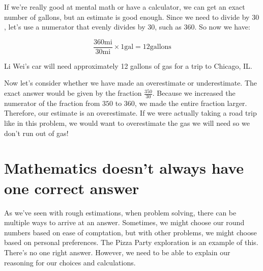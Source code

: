 \documentclass{ximera}
\begin{document}
\begin{example}
\begin{explanation}
If we're really good at mental math or have a calculator, we can get an exact number of gallons, but an estimate is good enough. Since we need to divide by $30$, let's use a numerator that evenly divides by $30$, such as $360$. So now we have:

$$ \frac{360 \text{mi}}{30\text{mi}} \times{1 \text{gal}}= 12 \text{gallons}$$

Li Wei's car will need approximately 12 gallons of gas for a trip to Chicago, IL.

Now let's consider whether we have made an overestimate or underestimate.  The exact answer would be given by the fraction $\frac{350}{30}$.  Because we increased the numerator of the fraction from $350$ to $360$, we made the entire fraction larger.  Therefore, our estimate is an overestimate.  If we were actually taking a road trip like in this problem, we would want to overestimate the gas we will need so we don't run out of gas!

\end{explanation}
\end{example}

\section{Mathematics doesn't always have one correct answer}

As we've seen with rough estimations, when problem solving, there can be multiple ways to arrive at an answer. Sometimes, we might choose our round numbers based on ease of comptation, but with other problems, we might choose based on personal preferences.  The Pizza Party exploration is an example of this.  There's no one right answer. However, we need to be able to explain our reasoning for our choices and calculations.
\end{document}
